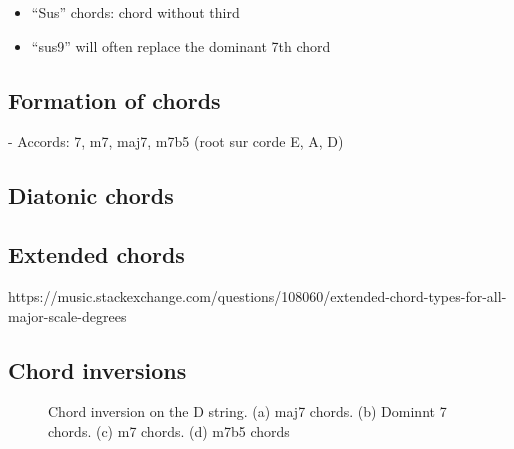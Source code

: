 \documentclass{article}
\begin{document}
\begin{itemize}
	\item ``Sus'' chords: chord without third
	\item ``sus9'' will often replace the dominant 7th chord
\end{itemize}

\newpage
\subsection{Formation of chords}



- Accords: 7, m7, maj7, m7b5 (root sur corde E, A, D)


\newpage
\subsection{Diatonic chords}




\subsection{Extended chords}

https://music.stackexchange.com/questions/108060/extended-chord-types-for-all-major-scale-degrees

\newpage
\subsection{Chord inversions}

\begin{figure}[h!]
	\centering
	\hspace*{-2.2cm}
	\scalebox{0.7}{}
	\hspace*{-2.2cm}
	\scalebox{0.7}{}
	\hspace*{-2.2cm}
	\scalebox{0.7}{}
	\hspace*{-2.2cm}
	\scalebox{0.7}{}
	\caption{Chord inversion on the D string. (a) maj7 chords. (b) Dominnt 7 chords. (c) m7 chords. (d) m7b5 chords }
	\label{fig}
\end{figure}
\end{document}
